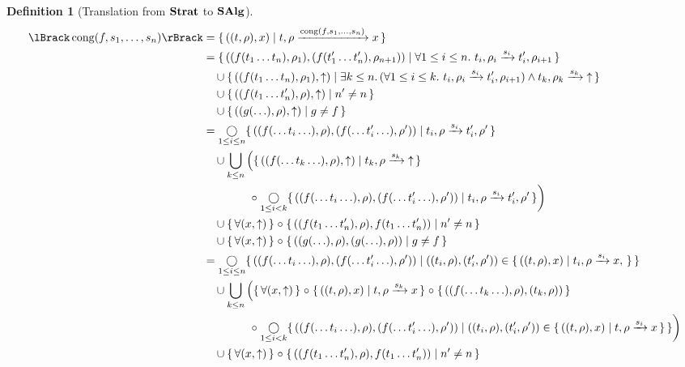 \documentclass{article}
\newtheorem{definition}[theorem]{Definition}
\begin{document}
\begin{definition}[Translation from $\mathbf{Strat}$ to $\mathbf{SAlg}$]
\begin{align*}
  \sem{\congr{f,s_1,\ldots,s_n}}
    &= \setbuild{((t,\rho),x)}{\transformx{t}{\rho}{\congr{f,s_1,\ldots,s_n}}{x}} \\
    &= \setbuild{((f(t_1\ldots t_n),\rho_1),(f(t_1'\ldots t_n'),\rho_{n+1}))}{ \forall 1 \leq i \leq n.\ \transform{t_i}{\rho_i}{s_i}{t_i'}{\rho_{i+1}}} \\
    &\quad \cup \setbuild{((f(t_1\ldots t_n),\rho_1),\fail)}{ \exists k \leq n.\, (\forall 1 \leq i \leq k.\ \transform{t_i}{\rho_i}{s_i}{t_i'}{\rho_{i+1}}) \land \transformfail{t_k}{\rho_k}{s_k}} \\
    &\quad \cup \setbuild{((f(t_1\ldots t_n'),\rho),\fail)}{ n' \neq n } \\
    &\quad \cup \setbuild{((g(\ldots),\rho),\fail)}{ g \neq f } \\
    &= \Comp_{1\leq i \leq n} \setbuild{((f(\ldots t_i \ldots),\rho),(f(\ldots t_i' \ldots),\rho'))}{ \transform{t_i}{\rho}{s_i}{t_i'}{\rho'} } \\
    &\quad \cup \bigcup_{k \leq n} \left( \setbuild{ ((f(\ldots t_k \ldots),\rho),\fail) }{ \transformx{t_k}{\rho}{s_k}{\fail} } \right. \\
    &\qquad\qquad \left. \comp \mathop{\bigcirc}_{1\leq i < k} \setbuild{((f(\ldots t_i \ldots),\rho),(f(\ldots t_i' \ldots),\rho'))}{ \transform{t_i}{\rho}{s_i}{t_i'}{\rho'} } \right) \\
    &\quad \cup \setbuildc{ \forall (x,\fail) } \comp \setbuild{((f(t_1\ldots t_n'),\rho),f(t_1\ldots t_n'))}{ n' \neq n } \\
    &\quad \cup \setbuildc{ \forall (x,\fail) } \comp \setbuild{((g(\ldots),\rho),(g(\ldots),\rho))}{ g \neq f } \\
    &= \Comp_{1\leq i \leq n} \setbuild{((f(\ldots t_i \ldots),\rho),(f(\ldots t_i' \ldots),\rho'))}{ ((t_i,\rho),(t_i',\rho')) \in \setbuild{ ((t,\rho),x) }{ \transform{t_i}{\rho}{s_i}{x} } } \\
    &\quad \cup \bigcup_{k \leq n} \left( \setbuildc{ \forall (x,\fail) } \comp \setbuild{ ((t,\rho),x) }{ \transformx{t}{\rho}{s_k}{x} } \comp \setbuildc{ ((f(\ldots t_k \ldots),\rho),(t_k,\rho)) } \right. \\
    &\qquad\qquad \left. \comp \mathop{\bigcirc}_{1\leq i < k} \setbuild{((f(\ldots t_i \ldots),\rho),(f(\ldots t_i' \ldots),\rho'))}{ ((t_i,\rho),(t_i',\rho')) \in \setbuild{ ((t,\rho),x) }{ \transformx{t}{\rho}{s_i}{x} } } \right) \\
    &\quad \cup \setbuildc{ \forall (x,\fail) } \comp \setbuild{((f(t_1\ldots t_n'),\rho),f(t_1\ldots t_n'))}{ n' \neq n } \\

\end{align*}
\end{definition}
\end{document}
